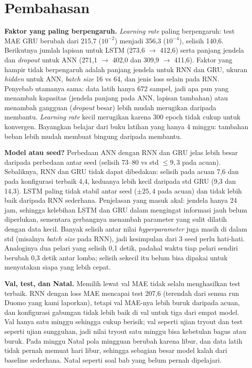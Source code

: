 \documentclass[conference,a4paper]{IEEEtran}
\begin{document}
\section{Pembahasan}
\textbf{Faktor yang paling berpengaruh.} \textit{Learning rate} paling berpengaruh: test MAE GRU berubah dari 215,7 ($10^{-2}$) menjadi 356,3 ($10^{-4}$), selisih 140,6. Berikutnya jumlah lapisan untuk LSTM (273,6 $\to$ 412,6) serta panjang jendela dan \textit{dropout} untuk ANN (271,1 $\to$ 402,0 dan 309,9 $\to$ 411,6). Faktor yang hampir tidak berpengaruh adalah panjang jendela untuk RNN dan GRU, ukuran \textit{hidden} untuk ANN, \textit{batch size} 16 vs 64, dan jenis loss selain pada RNN. Penyebab utamanya sama: data latih hanya 672 sampel, jadi apa pun yang menambah kapasitas (jendela panjang pada ANN, lapisan tambahan) atau menambah gangguan (\textit{dropout} besar) lebih mudah merugikan daripada membantu. \textit{Learning rate} kecil merugikan karena 300 epoch tidak cukup untuk konvergen. Bayangkan belajar dari buku latihan yang hanya 4 minggu: tambahan beban lebih mudah membuat bingung daripada membantu.
 
\textbf{Model atau seed?} Perbedaan ANN dengan RNN dan GRU jelas lebih besar daripada perbedaan antar seed (selisih 73--80 vs std $\le 9{,}3$ pada acuan). Sebaliknya, RNN dan GRU tidak dapat dibedakan: selisih pada acuan 7,6 dan pada konfigurasi terbaik 4,4, keduanya lebih kecil daripada std GRU (9,3 dan 14,3). LSTM paling tidak stabil antar seed ($\pm 25{,}4$ pada acuan) dan tidak lebih baik daripada RNN sederhana. Penjelasan yang masuk akal: jendela hanya 24 jam, sehingga kelebihan LSTM dan GRU dalam mengingat informasi jauh belum diperlukan, sementara gerbangnya menambah parameter yang sulit dilatih dengan data kecil. Banyak selisih antar nilai \textit{hyperparameter} juga masih di dalam std (misalnya \textit{batch size} pada RNN), jadi kesimpulan dari 3 seed perlu hati-hati. Analoginya dua pelari yang selisih 0,1 detik, padahal waktu tiap pelari sendiri berubah 0,3 detik antar lomba; selisih sekecil itu belum bisa dipakai untuk menyatakan siapa yang lebih cepat.
 
\textbf{Val, test, dan Natal.} Memilih lewat val MAE tidak selalu menghasilkan test terbaik. RNN dengan loss MAE mencapai test 207,6 (terendah dari semua run Duomo yang kami laporkan), tetapi val MAE-nya lebih buruk daripada acuan, dan konfigurasi gabungan tidak lebih baik di val untuk tiga dari empat model. Val hanya satu minggu sehingga cukup berisik; val seperti ujian tryout dan test seperti ujian sungguhan, jadi nilai tryout satu minggu bisa kebetulan bagus atau buruk. Pada minggu Natal pola mingguan berubah karena libur, dan data latih tidak pernah memuat hari libur, sehingga sebagian besar model kalah dari baseline sederhana. Natal seperti soal bab yang belum pernah dipelajari.
 
\end{document}
